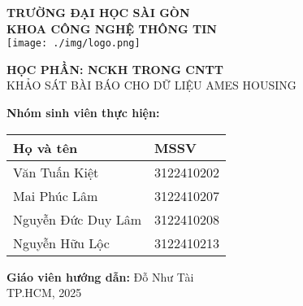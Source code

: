 \centering
{\LARGE \textbf{TRƯỜNG ĐẠI HỌC SÀI GÒN}} \\[0.2cm]
{\Large \textbf{KHOA CÔNG NGHỆ THÔNG TIN}} \\[0.5cm]

\vspace{0.5cm} 
\texttt{[image: ./img/logo.png]} %
\vspace{0.5cm} %

{\huge \textbf{HỌC PHẦN: NCKH TRONG CNTT}} \\[0.5cm]
{\Large KHẢO SÁT BÀI BÁO CHO DỮ LIỆU AMES HOUSING} \\[0.5cm]

\vspace{0.5cm} %

\textbf{Nhóm sinh viên thực hiện:} \\[0.5cm]

\begin{tabular}{|l|l|}
    \hline
    \textbf{Họ và tên} & \textbf{MSSV} \\ \hline
    Văn Tuấn Kiệt & 3122410202 \\ \hline
    Mai Phúc Lâm & 3122410207 \\ \hline
    Nguyễn Đức Duy Lâm & 3122410208 \\ \hline
    Nguyễn Hữu Lộc & 3122410213 \\ \hline
\end{tabular}

\vspace{0.5cm}

\textbf{Giáo viên hướng dẫn:} Đỗ Như Tài \\[0.5cm]

\vfill
{\Large TP.HCM, 2025}